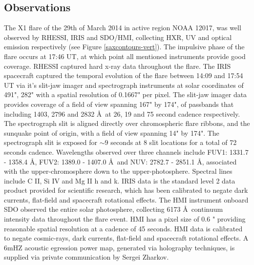 \subsection{Observations}
The X1 flare of the 29th of March 2014 in active region NOAA 12017, was well observed by RHESSI, IRIS and SDO/HMI, collecting HXR, UV and optical emission respectively (see Figure \ref{saxcontours-vert}). The impulsive phase of the flare occurs at 17:46 UT, at which point all mentioned instruments provide good coverage. RHESSI captured hard x-ray data throughout the flare.%
 The IRIS spacecraft captured the temporal evolution of the flare between 14:09 and 17:54 UT via it's slit-jaw imager and spectrograph instruments at solar coordinates of 491", 282" with a spatial resolution of 0.1667" per pixel. The slit-jaw imager data provides coverage of a field of view spanning 167" by 174", of passbands that including 1403, 2796 and 2832 \AA\ at 26, 19 and 75 second cadence respectively. The spectrograph slit is aligned directly over chromospheric flare ribbons, and the sunquake point of origin, with a field of view spanning 14" by 174". The spectrograph slit is exposed for $\sim9$ seconds at 8 slit locations for a total of 72 seconds cadence. Wavelengths observed over three channels include FUV1: 1331.7 - 1358.4 \AA, FUV2: 1389.0 - 1407.0 \AA\ and NUV: 2782.7 - 2851.1 \AA, associated with the upper-chromosphere down to the upper-photosphere. Spectral lines include C II, Si IV and Mg II h and k. IRIS data is the standard level 2 data product provided for scientific research, which has been calibrated to negate dark currents, flat-field and spacecraft rotational effects. The HMI instrument onboard SDO observed the entire solar photosphere, collecting 6173 \AA\ continuum intensity data throughout the flare event. HMI has a pixel size of 0.6 " providing reasonable spatial resolution at a cadence of 45 seconds. HMI data is calibrated to negate cosmic-rays, dark currents, flat-field and spacecraft rotational effects. A 6mHZ acoustic egression power map, generated via holography techniques, is supplied via private communication by Sergei Zharkov.

